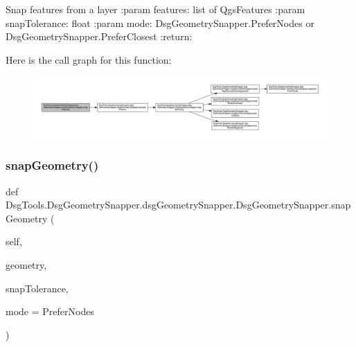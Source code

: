 \begin{DoxyVerb}Snap features from a layer
:param features: list of QgsFeatures
:param snapTolerance: float
:param mode: DsgGeometrySnapper.PreferNodes or DsgGeometrySnapper.PreferClosest
:return:
\end{DoxyVerb}
 Here is the call graph for this function\+:
\nopagebreak
\begin{figure}[H]
\begin{center}
\leavevmode
\includegraphics[width=350pt]{class_dsg_tools_1_1_dsg_geometry_snapper_1_1dsg_geometry_snapper_1_1_dsg_geometry_snapper_aaa4a4b66cca80225f32087717f300309_cgraph}
\end{center}
\end{figure}
\mbox{\label{class_dsg_tools_1_1_dsg_geometry_snapper_1_1dsg_geometry_snapper_1_1_dsg_geometry_snapper_afe06a8fafb4327a2bb278177c2ccdcf5}} 
\subsubsection{\texorpdfstring{snap\+Geometry()}{snapGeometry()}}
{\footnotesize\ttfamily def Dsg\+Tools.\+Dsg\+Geometry\+Snapper.\+dsg\+Geometry\+Snapper.\+Dsg\+Geometry\+Snapper.\+snap\+Geometry (\begin{DoxyParamCaption}\item[{}]{self,  }\item[{}]{geometry,  }\item[{}]{snap\+Tolerance,  }\item[{}]{mode = {\ttfamily PreferNodes} }\end{DoxyParamCaption})}

